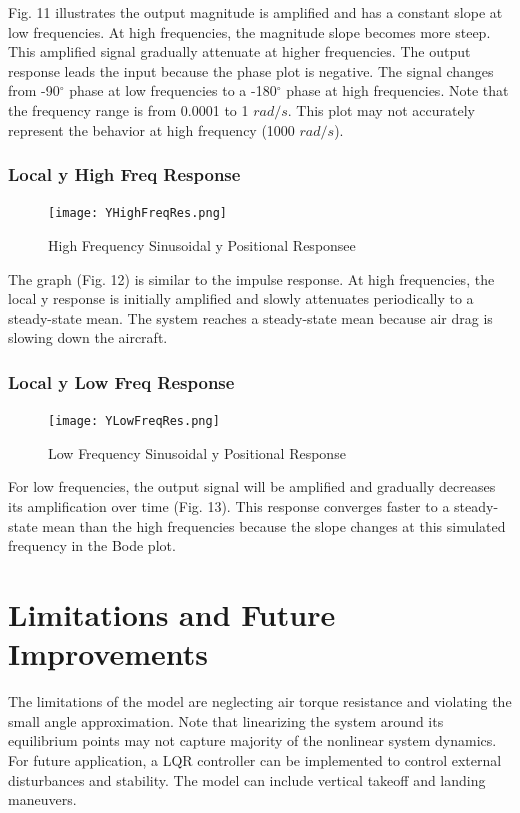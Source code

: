 \documentclass[conference]{IEEEtran}
\begin{document}
Fig. 11 illustrates the output magnitude is amplified and has a constant slope at low frequencies. At high frequencies, the magnitude slope becomes more steep. This amplified signal gradually attenuate at higher frequencies. The output response leads the input because the phase plot is negative. The signal changes from -90$^{\circ}$ phase at low frequencies to a -180$^{\circ}$ phase at high frequencies.
Note that the frequency range is from 0.0001 to 1 $rad/s$. This plot may not accurately represent the behavior at high frequency (1000 $rad/s$).
\subsubsection{Local y High Freq Response} 
\begin{figure}[htbp]
\centering
\centerline{\texttt{[image: YHighFreqRes.png]}}
\caption{High Frequency Sinusoidal y Positional Responsee}
\label{figure}
\end{figure}

The graph (Fig. 12) is similar to the impulse response. At high frequencies, the local y response is initially amplified and slowly attenuates periodically to a steady-state mean. The system reaches a steady-state mean because air drag is slowing down the aircraft. \\

\newpage
\subsubsection{Local y Low Freq Response} 
\begin{figure}[htbp]
\centerline{\texttt{[image: YLowFreqRes.png]}}
\caption{Low Frequency Sinusoidal y Positional Response}
\label{figure}
\end{figure}

For low frequencies, the output signal will be amplified and gradually decreases its amplification over time (Fig. 13). This response converges faster to a steady-state mean than the high frequencies because the slope changes at this simulated frequency in the Bode plot. \\


\section{Limitations and Future Improvements}
The limitations of the model are neglecting air torque resistance and violating the small angle approximation. Note that linearizing the system around its equilibrium points may not capture majority of the nonlinear system dynamics. For future application, a LQR controller can be implemented to control external disturbances and stability. The model can include vertical takeoff and landing maneuvers.
\end{document}
